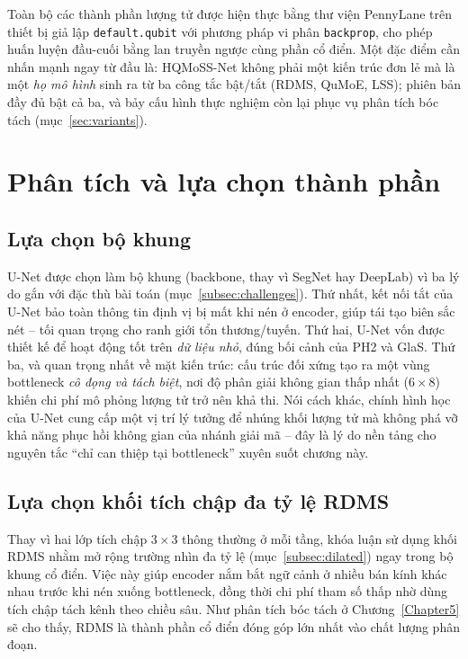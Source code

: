 Toàn bộ các thành phần lượng tử được hiện thực bằng thư viện PennyLane trên thiết bị giả lập \texttt{default.qubit} với phương pháp vi phân \texttt{backprop}, cho phép huấn luyện đầu-cuối bằng lan truyền ngược cùng phần cổ điển. Một đặc điểm cần nhấn mạnh ngay từ đầu là: HQMoSS-Net không phải một kiến trúc đơn lẻ mà là một \emph{họ mô hình} sinh ra từ ba công tắc bật/tắt (RDMS, QuMoE, LSS); phiên bản đầy đủ bật cả ba, và bảy cấu hình thực nghiệm còn lại phục vụ phân tích bóc tách (mục~\ref{sec:variants}).

\section{Phân tích và lựa chọn thành phần}
\subsection{Lựa chọn bộ khung}
U-Net được chọn làm bộ khung (backbone, thay vì SegNet hay DeepLab) vì ba lý do gắn với đặc thù bài toán (mục~\ref{subsec:challenges}). Thứ nhất, kết nối tắt của U-Net bảo toàn thông tin định vị bị mất khi nén ở encoder, giúp tái tạo biên sắc nét -- tối quan trọng cho ranh giới tổn thương/tuyến. Thứ hai, U-Net vốn được thiết kế để hoạt động tốt trên \emph{dữ liệu nhỏ}, đúng bối cảnh của PH2 và GlaS. Thứ ba, và quan trọng nhất về mặt kiến trúc: cấu trúc đối xứng tạo ra một vùng bottleneck \emph{cô đọng và tách biệt}, nơi độ phân giải không gian thấp nhất ($6\times 8$) khiến chi phí mô phỏng lượng tử trở nên khả thi. Nói cách khác, chính hình học của U-Net cung cấp một vị trí lý tưởng để nhúng khối lượng tử mà không phá vỡ khả năng phục hồi không gian của nhánh giải mã -- đây là lý do nền tảng cho nguyên tắc ``chỉ can thiệp tại bottleneck'' xuyên suốt chương này.

\subsection{Lựa chọn khối tích chập đa tỷ lệ RDMS}
Thay vì hai lớp tích chập $3\times 3$ thông thường ở mỗi tầng, khóa luận sử dụng khối RDMS nhằm mở rộng trường nhìn đa tỷ lệ (mục~\ref{subsec:dilated}) ngay trong bộ khung cổ điển. Việc này giúp encoder nắm bắt ngữ cảnh ở nhiều bán kính khác nhau trước khi nén xuống bottleneck, đồng thời chi phí tham số thấp nhờ dùng tích chập tách kênh theo chiều sâu. Như phân tích bóc tách ở Chương~\ref{Chapter5} sẽ cho thấy, RDMS là thành phần cổ điển đóng góp lớn nhất vào chất lượng phân đoạn.

